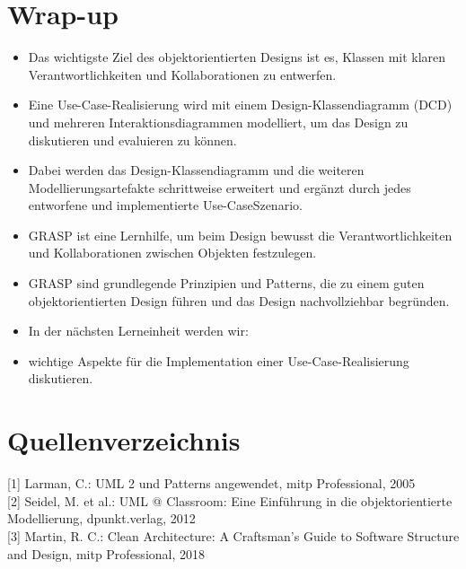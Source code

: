 \documentclass[10pt]{article}
\begin{document}
\section*{Wrap-up}
\begin{itemize}
  \item Das wichtigste Ziel des objektorientierten Designs ist es, Klassen mit klaren Verantwortlichkeiten und Kollaborationen zu entwerfen.
  \item Eine Use-Case-Realisierung wird mit einem Design-Klassendiagramm (DCD) und mehreren Interaktionsdiagrammen modelliert, um das Design zu diskutieren und evaluieren zu können.
  \item Dabei werden das Design-Klassendiagramm und die weiteren Modellierungsartefakte schrittweise erweitert und ergänzt durch jedes entworfene und implementierte Use-CaseSzenario.
  \item GRASP ist eine Lernhilfe, um beim Design bewusst die Verantwortlichkeiten und Kollaborationen zwischen Objekten festzulegen.
  \item GRASP sind grundlegende Prinzipien und Patterns, die zu einem guten objektorientierten Design führen und das Design nachvollziehbar begründen.
  \item In der nächsten Lerneinheit werden wir:
  \item wichtige Aspekte für die Implementation einer Use-Case-Realisierung diskutieren.
\end{itemize}

\section*{Quellenverzeichnis}
[1] Larman, C.: UML 2 und Patterns angewendet, mitp Professional, 2005\\[0pt]
[2] Seidel, M. et al.: UML @ Classroom: Eine Einführung in die objektorientierte Modellierung, dpunkt.verlag, 2012\\[0pt]
[3] Martin, R. C.: Clean Architecture: A Craftsman's Guide to Software Structure and Design, mitp Professional, 2018
\end{document}
